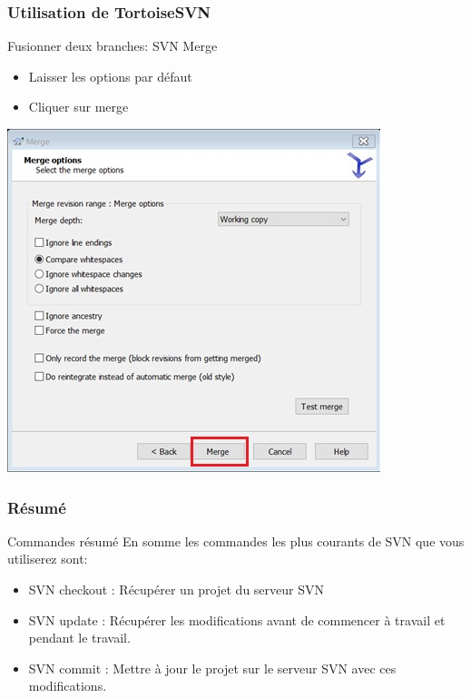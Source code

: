 \documentclass{beamer}
\begin{document}
\begin{frame}
\frametitle{Utilisation de TortoiseSVN}
\begin{block}{Fusionner deux branches: SVN Merge}
\begin{itemize}
\item Laisser les options par défaut
\item Cliquer sur merge
\end{itemize}
\end{block}
\includegraphics[scale=.7]{../images/merge4.jpg}

\end{frame}
\begin{frame}
\frametitle{Résumé}
\begin{block}{Commandes résumé}
En somme  les commandes les plus courants de SVN que vous  utiliserez sont:
\begin{itemize}
\item  SVN checkout : Récupérer un projet du serveur SVN
\item SVN update : Récupérer les modifications avant de commencer à travail et pendant le travail. 
\item SVN commit : Mettre à jour le projet sur le serveur SVN avec ces modifications.
\end{itemize}
\end{block}

\end{frame}
\end{document}

